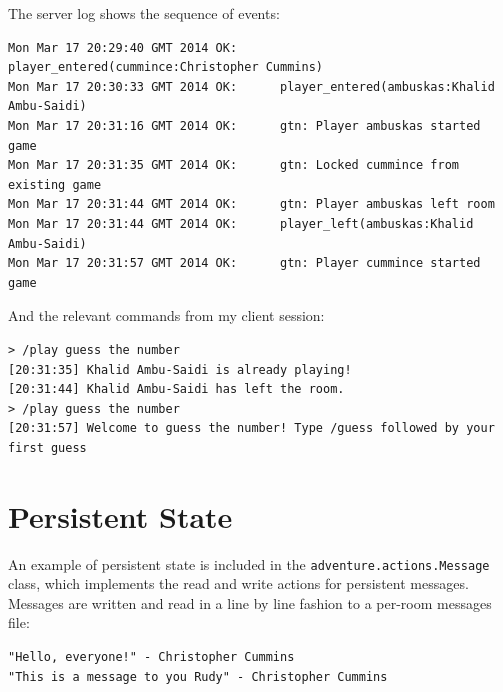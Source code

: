\documentclass[12pt,a4paper]{article}
\begin{document}
The server log shows the sequence of events:

\begin{verbatim}
Mon Mar 17 20:29:40 GMT 2014 OK:      player_entered(cummince:Christopher Cummins)
Mon Mar 17 20:30:33 GMT 2014 OK:      player_entered(ambuskas:Khalid Ambu-Saidi)
Mon Mar 17 20:31:16 GMT 2014 OK:      gtn: Player ambuskas started game
Mon Mar 17 20:31:35 GMT 2014 OK:      gtn: Locked cummince from existing game
Mon Mar 17 20:31:44 GMT 2014 OK:      gtn: Player ambuskas left room
Mon Mar 17 20:31:44 GMT 2014 OK:      player_left(ambuskas:Khalid Ambu-Saidi)
Mon Mar 17 20:31:57 GMT 2014 OK:      gtn: Player cummince started game
\end{verbatim}

And the relevant commands from my client session:

\begin{verbatim}
> /play guess the number
[20:31:35] Khalid Ambu-Saidi is already playing!
[20:31:44] Khalid Ambu-Saidi has left the room.
> /play guess the number
[20:31:57] Welcome to guess the number! Type /guess followed by your first guess
\end{verbatim}


\section{Persistent State}

An example of persistent state is included in the
\texttt{adventure.actions.Message} class, which implements the read
and write actions for persistent messages. Messages are written and
read in a line by line fashion to a per-room messages file:

\begin{verbatim}
"Hello, everyone!" - Christopher Cummins
"This is a message to you Rudy" - Christopher Cummins
\end{verbatim}
\end{document}
